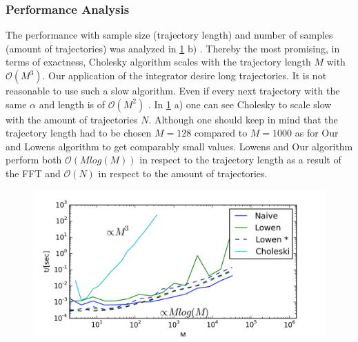 \documentclass[
  a4paper,BCOR10mm,oneside,
  headsepline,footsepline,%
  fleqn,openbib
]{scrbook}
\begin{document}
\subsubsection{Performance Analysis}
The performance with sample size (trajectory length) and number of samples (amount of trajectories) was analyzed in \cref{fig:200} b) . Thereby the most promising, in terms of exactness, Cholesky algorithm scales with the trajectory length $M$ with $\mathcal{O}(M^3)$. Our application of the integrator desire long trajectories. It is not reasonable to use such a slow algorithm. Even if every next trajectory with the same $\alpha$ and length is of  $\mathcal{O}(M^2)$ \cite{Dieker2004}. In \cref{fig:200} a) one can see Cholesky to scale slow with the amount of trajectories $N$. Although one should keep in mind that the trajectory length had to be chosen $M=128$ compared to $M=1000$ as for Our and Lowens algorithm to get comparably small values. Lowens and Our algorithm perform both $\mathcal{O}(M log(M))$ in respect to the trajectory length as a result of the FFT and $\mathcal{O}(N)$ in respect to the amount of trajectories.
\begin{figure}[h!]
  \centering
  \includegraphics[width=\linewidth]{./data/nongaussiandouble1.png}
  \captionsetup{width=1.0\linewidth}
  \label{fig:200}
\end{figure}
\end{document}
